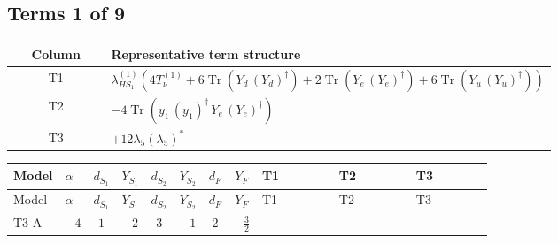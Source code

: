 \documentclass[8pt]{article}
\begin{document}
\begin{landscape}
\subsection*{Terms 1 of 9}
\begin{center}
\begin{tabular}{@{}c >{\raggedright\arraybackslash}p{0.82\linewidth}@{}}
\toprule
Column & Representative term structure \\
\midrule
T1 & \(\displaystyle {\lambda_{HS_1}^{(1)}} (4 T_{\nu}^{(1)}+6 \operatorname{Tr}\!\left({Y_d}\,\left({Y_d}\right)^{\dagger}\right)+2 \operatorname{Tr}\!\left({Y_e}\,\left({Y_e}\right)^{\dagger}\right)+6 \operatorname{Tr}\!\left({Y_u}\,\left({Y_u}\right)^{\dagger}\right))\) \\
\midrule
T2 & \(\displaystyle -4 \operatorname{Tr}\!\left({y_1}\,\left({y_1}\right)^{\dagger}\,{Y_e}\,\left({Y_e}\right)^{\dagger}\right)\) \\
\midrule
T3 & \(\displaystyle +12 {\lambda_5} \left({\lambda_5}\right)^{*}\) \\
\midrule
\bottomrule
\end{tabular}
\end{center}
\smallskip
\tiny
\begin{longtable}{@{}llcccccc >{\raggedright\arraybackslash}p{0.21\linewidth} >{\raggedright\arraybackslash}p{0.21\linewidth} >{\raggedright\arraybackslash}p{0.21\linewidth}@{}}
\toprule
Model & $\alpha$ & $d_{S_1}$ & $Y_{S_1}$ & $d_{S_2}$ & $Y_{S_2}$ & $d_F$ & $Y_F$ & T1 & T2 & T3 \\
\midrule
\endfirsthead
\toprule
Model & $\alpha$ & $d_{S_1}$ & $Y_{S_1}$ & $d_{S_2}$ & $Y_{S_2}$ & $d_F$ & $Y_F$ & T1 & T2 & T3 \\
\midrule
\endhead
T3-A & $-4$ & $1$ & $-2$ & $3$ & $-1$ & $2$ & $-\frac{3}{2}$ & \scriptsize\adjustbox{max width=\linewidth}{$\begin{gathered} {\lambda_{HS_1}^{(1)}} (4 T_{\nu}^{(1)}+6 \operatorname{Tr}\!\left({Y_d}\,\left({Y_d}\right)^{\dagger}\right)+2 \operatorname{Tr}\!\left({Y_e}\,\left({Y_e}\right)^{\dagger}\right)+6 \operatorname{Tr}\!\left({Y_u}\,\left({Y_u}\right)^{\dagger}\right))\end{gathered}$} & \scriptsize\adjustbox{max width=\linewidth}{$\begin{gathered} -4 \operatorname{Tr}\!\left({y_1}\,\left({y_1}\right)^{\dagger}\,{Y_e}\,\left({Y_e}\right)^{\dagger}\right)\end{gathered}$} & \scriptsize\adjustbox{max width=\linewidth}{$\begin{gathered} +12 {\lambda_5} \left({\lambda_5}\right)^{*}\end{gathered}$} \\

\end{longtable}
\end{landscape}
\end{document}
